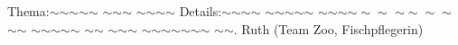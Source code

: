 
%
	{Thema:}{$\sim$$\sim$$\sim$$\sim$$\sim$ $\sim$$\sim$$\sim$ $\sim$$\sim$$\sim$$\sim$}%
	{Details:}{$\sim$$\sim$$\sim$$\sim$ $\sim$$\sim$$\sim$$\sim$$\sim$ $\sim$$\sim$$\sim$$\sim\sim\sim$ $\sim\sim\sim\sim$ $\sim$$\sim$ $\sim$$\sim$$\sim$$\sim$$\sim$ $\sim$$\sim$ $\sim$$\sim$$\sim$ $\sim$$\sim$$\sim$$\sim$$\sim$$\sim$$\sim$ $\sim$$\sim$.}
	{Ruth (Team Zoo, Fischpflegerin)}